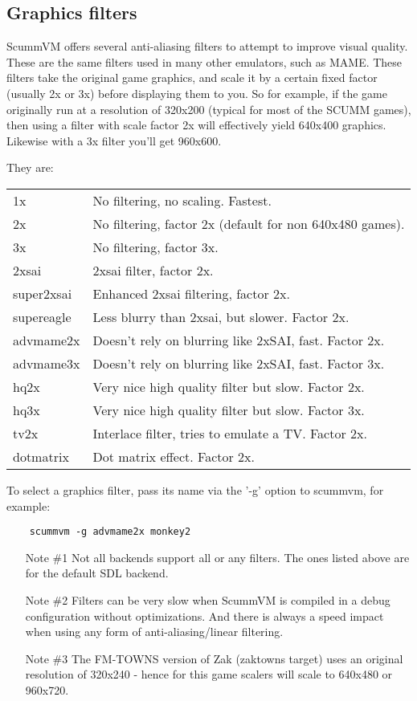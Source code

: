

\subsection {Graphics filters} \label{sect-gfx-filters}
ScummVM offers several anti-aliasing filters to attempt to improve visual
quality. These are the same filters used in many other emulators, such as
MAME. These filters take the original game graphics, and scale it by a 
certain fixed factor (usually 2x or 3x) before displaying them to you.
So for example, if the game originally run at a resolution of 320x200
(typical for most of the SCUMM games), then using a filter with scale
factor 2x will effectively yield 640x400 graphics. Likewise with a 
3x filter you'll get 960x600.

They are:\\
\begin{tabular}[h]{ll}
  1x         & No filtering, no scaling. Fastest.\\
  2x         & No filtering, factor 2x (default for non 640x480 games).\\
  3x         & No filtering, factor 3x.\\
  2xsai      & 2xsai filter, factor 2x.\\
  super2xsai & Enhanced 2xsai filtering, factor 2x.\\
  supereagle & Less blurry than 2xsai, but slower. Factor 2x.\\
  advmame2x  & Doesn't rely on blurring like 2xSAI, fast. Factor 2x.\\
  advmame3x  & Doesn't rely on blurring like 2xSAI, fast. Factor 3x.\\
  hq2x       & Very nice high quality filter but slow. Factor 2x.\\
  hq3x       & Very nice high quality filter but slow. Factor 3x.\\
  tv2x       & Interlace filter, tries to emulate a TV. Factor 2x.\\
  dotmatrix  & Dot matrix effect. Factor 2x.\\
\end{tabular}

To select a graphics filter, pass its name via the '-g' option to scummvm,
for example:

\begin{verbatim}
    scummvm -g advmame2x monkey2
\end{verbatim}
\begin{enumerate}
\item [Note \#1] Not all backends support all or any filters. The ones
  listed above are for the default SDL backend.
\item [Note \#2] Filters can be very slow when ScummVM is compiled in a
  debug configuration without optimizations. And there is always a
  speed impact when using any form of anti-aliasing/linear filtering.
\item [Note \#3] The FM-TOWNS version of Zak (zaktowns target) uses an
  original resolution of 320x240 - hence for this game scalers will
  scale to 640x480 or 960x720.
\end{enumerate}
